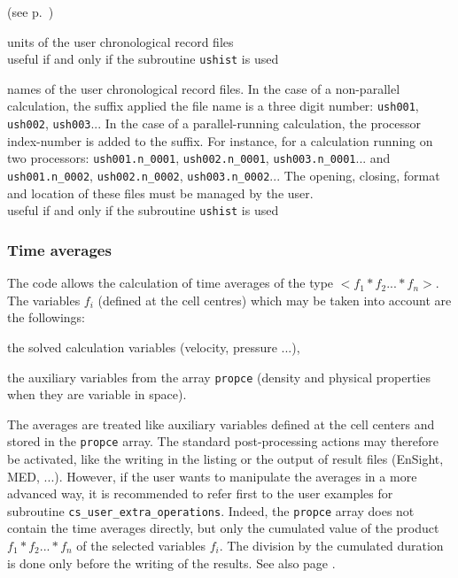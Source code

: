 (see p.~\pageref{sec:prg_ushist})

{units of the user chronological record files\\
useful if and only if the subroutine \texttt{ushist} is used}

{names of the user chronological record files.
In the case of a non-parallel calculation, the suffix applied the file
name is a three digit number: \texttt{ush001}, \texttt{ush002},
\texttt{ush003}...
In the case of a parallel-running calculation, the processor
index-number is added to the suffix. For instance, for a calculation
running on two processors:  \texttt{ush001.n\_0001},
\texttt{ush002.n\_0001}, \texttt{ush003.n\_0001}... and
\texttt{ush001.n\_0002},
\texttt{ush002.n\_0002}, \texttt{ush003.n\_0002}...
The opening, closing, format and location of these files must be managed
by the user.\\
useful if and only if the subroutine \texttt{ushist} is used}


\subsubsection{Time averages}

The code allows the calculation of time averages of the type
$<f_1*f_2...*f_n>$. The variables $f_i$ (defined at the cell centres)
which may be taken into account are the followings:
\begin{list}{-}{}
\item the solved calculation variables (velocity, pressure ...),
\item the auxiliary variables from the array {\tt propce} (density and
      physical properties when they are variable in space).
\end{list}

The averages are treated like auxiliary variables defined at the cell
centers and stored in the {\tt propce} array. The standard post-processing
actions may therefore be activated, like the writing in the listing or
the output of result files (EnSight, MED, ...). However, if the user
wants to manipulate the averages in a more advanced way, it is
recommended to refer first to the user examples for subroutine
\texttt{cs\_user\_extra\_operations}. Indeed, the {\tt propce} array
does not contain the time averages directly, but only the cumulated value
of the product $f_1*f_2...*f_n$ of the selected
variables $f_i$. The division by the cumulated duration is done only
before the writing of the results. See also page \pageref{sec:prg_moyennes}.

